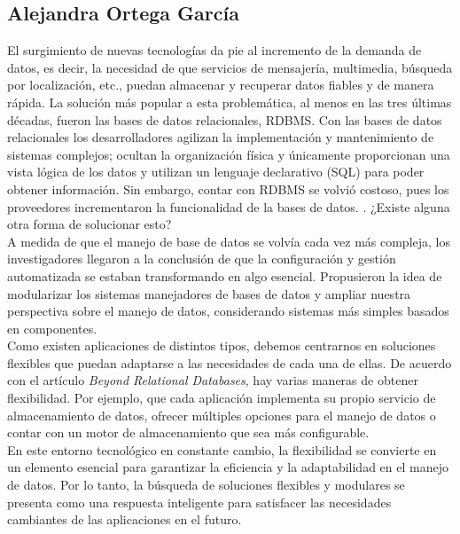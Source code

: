 \documentclass[12pt]{article}
\begin{document}
\newpage




\subsection*{Alejandra Ortega García}

El surgimiento de nuevas tecnologías da pie al incremento de la demanda de datos, es decir, la necesidad de que servicios de mensajería, multimedia, búsqueda por localización, etc.,  puedan almacenar y recuperar datos fiables y de manera rápida. La solución más popular a esta problemática, al menos en las tres últimas décadas, fueron las bases de datos relacionales, RDBMS. Con las  bases de datos relacionales los desarrolladores agilizan la implementación y mantenimiento de sistemas complejos; ocultan la organización física y únicamente proporcionan una vista lógica de los datos y utilizan un lenguaje declarativo (SQL) para poder obtener información. Sin embargo, contar con RDBMS se volvió costoso, pues los proveedores incrementaron la funcionalidad de la bases de datos. . ¿Existe alguna otra forma de solucionar esto?\\


A medida de que el manejo de base de datos se volvía cada vez más compleja, los investigadores llegaron a la conclusión de que la configuración y gestión  automatizada se estaban transformando en algo esencial. Propusieron la idea de modularizar los sistemas manejadores de bases de datos y ampliar nuestra perspectiva sobre el manejo de datos, considerando sistemas más simples basados en componentes.\\


Como existen aplicaciones de distintos tipos, debemos centrarnos en soluciones flexibles que puedan adaptarse a las necesidades de cada una de ellas. De acuerdo con el artículo \textit{Beyond Relational Databases}, hay varias maneras de obtener flexibilidad. Por ejemplo, que cada aplicación implementa su propio servicio de almacenamiento de datos, ofrecer múltiples opciones para el manejo de datos o contar con un motor de almacenamiento que sea más configurable. \\


En este entorno tecnológico en constante cambio, la flexibilidad se convierte en un elemento esencial para garantizar la eficiencia y la adaptabilidad en el manejo de datos. Por lo tanto, la búsqueda de soluciones flexibles y modulares se presenta como una respuesta inteligente para satisfacer las necesidades cambiantes de las aplicaciones en el futuro.
\end{document}
